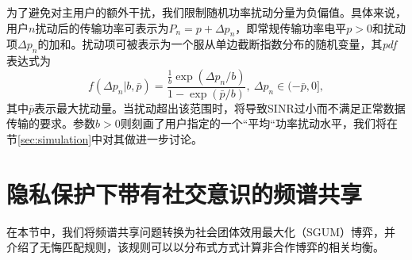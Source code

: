 为了避免对主用户的额外干扰，我们限制随机功率扰动分量为负偏值。具体来说，用户$n$扰动后的传输功率可表示为$P_n=p+\Delta p_n$，即常规传输功率电平$p> 0$和扰动项$\Delta p_n$的加和。扰动项可被表示为一个服从单边截断指数分布的随机变量，其\emph{pdf}表达式为
\begin{equation}\label{eq:noise}
f(\Delta p_n|b,\bar{p})=\frac{\frac{1}{b}\exp(\Delta p_n/b)}{1-\exp(\bar{p}/b)},~\Delta p_n\in(-\bar{p},0],
\end{equation}
其中$\bar{p}$表示最大扰动量。当扰动超出该范围时，将导致SINR过小而不满足正常数据传输的要求。参数$b>0$则刻画了用户指定的一个“平均“功率扰动水平，我们将在节\ref{sec:simulation}中对其做进一步讨论。


\section{隐私保护下带有社交意识的频谱共享}\label{sec:game}
在本节中，我们将频谱共享问题转换为社会团体效用最大化（SGUM）博弈，并介绍了无悔匹配规则，该规则可以以分布式方式计算非合作博弈的相关均衡。

